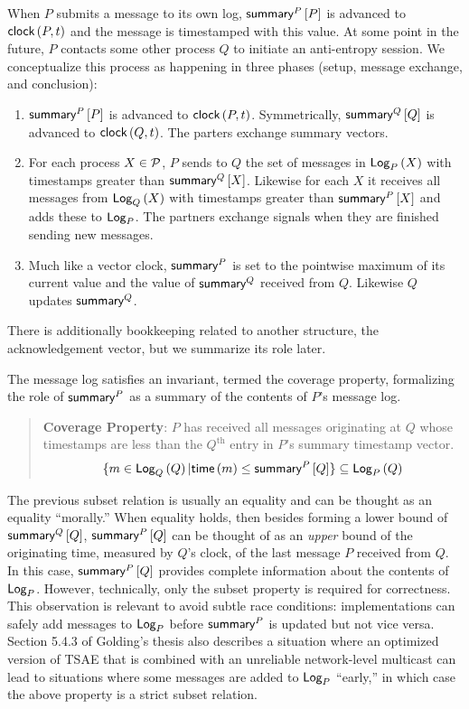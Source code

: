 \documentclass[]             %
{NASA}                       %
\theoremstyle{definition}
\begin{document}
When $P$ submits a message to its own log, $\textsf{summary}^{P}\left[P\right]$ is
advanced to $\textsf{clock}\left(P, t\right)$ and the message is timestamped with this
value. At some point in the future, $P$ contacts some other process
$Q$ to initiate an anti-entropy session. We conceptualize this process
as happening in three phases (setup, message exchange, and conclusion):
\begin{enumerate}
\item $\textsf{summary}^{P}\left[P\right]$ is advanced to $\textsf{clock}\left(P, t\right)$. Symmetrically,
  $\textsf{summary}^{Q}\left[Q\right]$ is advanced to $\textsf{clock}\left(Q, t\right)$. The parters exchange summary vectors.
\item For each process $X \in \mathcal{P}$, $P$ sends to $Q$ the set of
  messages in $\textsf{Log}_{P}\left(X\right)$ with timestamps greater than
  $\textsf{summary}^{Q}\left[X\right]$. Likewise for each $X$ it receives all messages
  from $\textsf{Log}_{Q}\left(X\right)$ with timestamps greater than $\textsf{summary}^{P}\left[X\right]$ and
  adds these to $\textsf{Log}_{P}$. The partners exchange signals when
  they are finished sending new messages.
\item Much like a vector clock, $\textsf{summary}^{P}$ is set to the pointwise maximum of its
  current value and the value of $\textsf{summary}^{Q}$ received from $Q$. Likewise
  $Q$ updates $\textsf{summary}^{Q}$.
\end{enumerate}
There is additionally bookkeeping related to another structure, the
acknowledgement vector, but we summarize its role later.

The message log satisfies an invariant, termed the coverage property,
formalizing the role of $\textsf{summary}^{P}$ as a summary of the contents
of $P$'s message log.
\begin{quote}
  \textbf{Coverage Property}: $P$ has received all messages
  originating at $Q$ whose timestamps are less than the
  $Q^\textrm{th}$ entry in $P$'s summary timestamp vector.
  \[ \{m \in \textsf{Log}_{Q}\left(Q\right) | \mathsf{time}\left(m\right) \leq \textsf{summary}^{P}\left[Q\right] \} \subseteq \textsf{Log}_{P}\left(Q\right) \]
\end{quote}
The previous subset relation is usually an equality and can be thought
as an equality ``morally.'' When equality holds, then besides forming
a lower bound of $\textsf{summary}^{Q}\left[Q\right]$, $\textsf{summary}^{P}\left[Q\right]$ can be thought of
as an \emph{upper} bound of the originating time, measured by $Q$'s
clock, of the last message $P$ received from $Q$. In this case,
$\textsf{summary}^{P}\left[Q\right]$ provides complete information about the contents of
$\textsf{Log}_{P}$. However, technically, only the subset property is required
for correctness. This observation is relevant to avoid subtle race
conditions: implementations can safely add messages to $\textsf{Log}_{P}$ before
$\textsf{summary}^{P}$ is updated but not vice versa. Section 5.4.3 of
Golding's thesis also describes a situation where an optimized version
of TSAE that is combined with an unreliable network-level multicast
can lead to situations where some messages are added to $\textsf{Log}_{P}$
``early,'' in which case the above property is a strict subset
relation.
\end{document}
